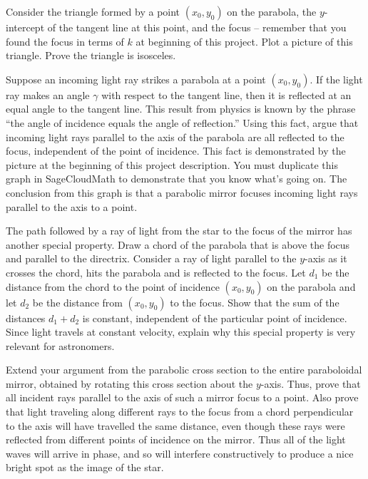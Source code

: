 \documentclass
[justified,nohyper]
{tufte-handout}
\theoremstyle{mydef}
\begin{document}
Consider the triangle formed by a point $(x_0,y_0)$ on the parabola, the $y$-
intercept of the tangent line at this point, and the focus -- remember that you 
found the focus in terms of $k$ at beginning of this project. Plot a picture of 
this triangle. Prove the triangle is isosceles.

Suppose an incoming light ray strikes a parabola at a point $(x_0,y_0)$. If the 
light ray makes an angle $\gamma$ with respect to the tangent line, then it is 
reflected at an equal angle to the tangent line. This result from physics is 
known by the phrase ``the angle of incidence equals the angle of reflection.'' 
Using this fact, argue that incoming light rays parallel to the axis of the 
parabola are all reflected to the focus, independent of the point of incidence. 
This fact is demonstrated by the picture at the beginning of this project 
description. You must duplicate this graph in SageCloudMath to demonstrate that 
you know what's going on. The conclusion from this graph is that a parabolic 
mirror focuses incoming light rays parallel to the axis to a point.

The path followed by a ray of light from the star to the focus of the mirror has 
another special property. Draw a chord of the parabola that is above the focus 
and parallel to the directrix. Consider a ray of light parallel to the $y$-axis 
as it crosses the chord, hits the parabola and is reflected to the focus. Let 
$d_1$ be the distance from the chord to the point of incidence $(x_0,y_0)$ on the 
parabola and let $d_2$ be the distance from $(x_0,y_0)$ to the focus. Show that 
the sum of the distances $d_1+d_2$ is constant, independent of the particular 
point of incidence. Since light travels at constant velocity, explain why this 
special property is very relevant for astronomers.

Extend your argument from the parabolic cross section to the entire paraboloidal 
mirror, obtained by rotating this cross section about the $y$-axis. Thus, prove 
that all incident rays parallel to the axis of such a mirror focus to a point. 
Also prove that light traveling along different rays to the focus from a chord 
perpendicular to the axis will have travelled the same distance, even though 
these rays were reflected from different points of incidence on the mirror. Thus 
all of the light waves will arrive in phase, and so will interfere constructively 
to produce a nice bright spot as the image of the star.
\end{document}
